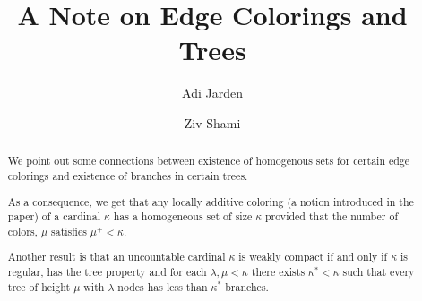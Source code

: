 \documentclass[11pt]{amsart}
\theoremstyle{plain}
\theoremstyle{definition} %
\theoremstyle{remark}
\begin{document}

\title{A Note on Edge Colorings and Trees}

\author{Adi Jarden}
\address{Department of Mathematics.\\ Ariel University \\ Ariel, Israel}

\author{Ziv Shami}
\address{Department of Mathematics.\\ Ariel University \\ Ariel, Israel}




\begin{abstract}
We point out some connections between existence of homogenous sets for certain edge colorings and existence of branches in certain trees.

As a consequence, we get that any locally additive coloring (a notion introduced in the paper) of a cardinal $\kappa$ has a homogeneous set of size $\kappa$ provided that the number of colors, $\mu$ satisfies $\mu^+<\kappa$.

Another result is that an uncountable cardinal $\kappa$ is weakly compact if and only if $\kappa$ is regular, has the tree property and for each $\lambda,\mu<\kappa$ there exists $\kappa^*<\kappa$ such that every tree of height $\mu$ with $\lambda$ nodes has less than $\kappa^*$ branches.

\end{abstract}











\maketitle

\tableofcontents
\end{document}
